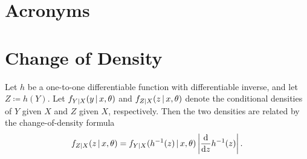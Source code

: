 \documentclass[a4paper,12pt]{article}
\begin{document}
\vfill
\section*{Acronyms}
\printglossaries

\clearpage
\appendix

\section{Change of Density}\label{app-density}

\begin{theorem}
	Let $h$ be a one-to-one differentiable function with differentiable inverse, and let
	$Z\coloneqq h(Y)$.
	Let $f_{Y\mathpunct{}|\mathpunct{} X}(y\mathpunct{}|\mathpunct{} x,\theta)$ and $f_{Z\mathpunct{}|\mathpunct{} X}(z\mathpunct{}|\mathpunct{} x,\theta)$ denote the conditional densities
	of $Y$ given $X$ and $Z$ given $X$, respectively.
	Then the two densities are related by the change-of-density formula
	\begin{align}\label{eq-change-of-density}
		f_{Z\mathpunct{}|\mathpunct{} X}(z\mathpunct{}|\mathpunct{} x,\theta)
		=f_{Y\mathpunct{}|\mathpunct{} X}(h^{-1}(z)\mathpunct{}|\mathpunct{} x,\theta)
		\left|\frac{\mathop{}\!{\mathrm{d}}}{\mathop{}\!{\mathrm{d}} z}h^{-1}(z)\right|.
	\end{align}
\end{theorem}
\end{document}
